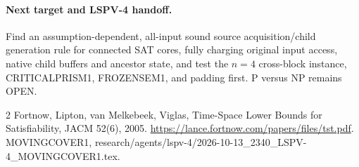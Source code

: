 \documentclass{article}
\begin{document}
\paragraph{Next target and LSPV-4 handoff.} Find an assumption-dependent, all-input sound source acquisition/child generation rule for connected SAT cores, fully charging original input access, native child buffers and ancestor state, and test the $n=4$ cross-block instance, CRITICALPRISM1, FROZENSEM1, and padding first. P versus NP remains OPEN.
\begin{thebibliography}{2}
 Fortnow, Lipton, van Melkebeek, Viglas, Time-Space Lower Bounds for Satisfiability, JACM 52(6), 2005. \url{https://lance.fortnow.com/papers/files/tst.pdf}.
 MOVINGCOVER1, research/agents/lspv-4/2026-10-13_2340_LSPV-4_MOVINGCOVER1.tex.
\end{thebibliography}
\end{document}
